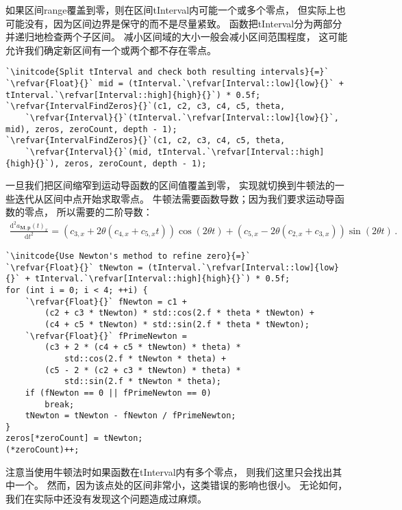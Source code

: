 如果区间{\ttfamily range}覆盖到零，则在区间{\ttfamily tInterval}内可能一个或多个零点，
但实际上也可能没有，因为区间边界是保守的而不是尽量紧致。
函数把{\ttfamily tInterval}分为两部分并递归地检查两个子区间。
减小区间域的大小一般会减小区间范围程度，
这可能允许我们确定新区间有一个或两个都不存在零点。
\begin{lstlisting}
`\initcode{Split tInterval and check both resulting intervals}{=}`
`\refvar{Float}{}` mid = (tInterval.`\refvar[Interval::low]{low}{}` + tInterval.`\refvar[Interval::high]{high}{}`) * 0.5f;
`\refvar{IntervalFindZeros}{}`(c1, c2, c3, c4, c5, theta,
    `\refvar{Interval}{}`(tInterval.`\refvar[Interval::low]{low}{}`, mid), zeros, zeroCount, depth - 1);
`\refvar{IntervalFindZeros}{}`(c1, c2, c3, c4, c5, theta,
    `\refvar{Interval}{}`(mid, tInterval.`\refvar[Interval::high]{high}{}`), zeros, zeroCount, depth - 1);
\end{lstlisting}

一旦我们把区间缩窄到运动导函数的区间值覆盖到零，
实现就切换到牛顿法的一些迭代从区间中点开始求取零点。
牛顿法需要函数导数；因为我们要求运动导函数的零点，
所以需要的二阶导数：
\begin{align*}
    \frac{\mathrm{d}^2a_{\bm M,\bm p}(t)_x}{\mathrm{d}t^2}=(c_{3,x}+2\theta(c_{4,x}+c_{5,x}t))\cos(2\theta t)+(c_{5,x}-2\theta(c_{2,x}+c_{3,x}))\sin(2\theta t)\, .
\end{align*}

\begin{lstlisting}
`\initcode{Use Newton's method to refine zero}{=}`
`\refvar{Float}{}` tNewton = (tInterval.`\refvar[Interval::low]{low}{}` + tInterval.`\refvar[Interval::high]{high}{}`) * 0.5f;
for (int i = 0; i < 4; ++i) {
    `\refvar{Float}{}` fNewton = c1 +
        (c2 + c3 * tNewton) * std::cos(2.f * theta * tNewton) +
        (c4 + c5 * tNewton) * std::sin(2.f * theta * tNewton);
    `\refvar{Float}{}` fPrimeNewton =
        (c3 + 2 * (c4 + c5 * tNewton) * theta) *
            std::cos(2.f * tNewton * theta) +
        (c5 - 2 * (c2 + c3 * tNewton) * theta) *
            std::sin(2.f * tNewton * theta);
    if (fNewton == 0 || fPrimeNewton == 0)
        break;
    tNewton = tNewton - fNewton / fPrimeNewton;
}
zeros[*zeroCount] = tNewton;
(*zeroCount)++;
\end{lstlisting}

注意当使用牛顿法时如果函数在{\ttfamily tInterval}内有多个零点，
则我们这里只会找出其中一个。
然而，因为该点处的区间非常小，这类错误的影响也很小。
无论如何，我们在实际中还没有发现这个问题造成过麻烦。
